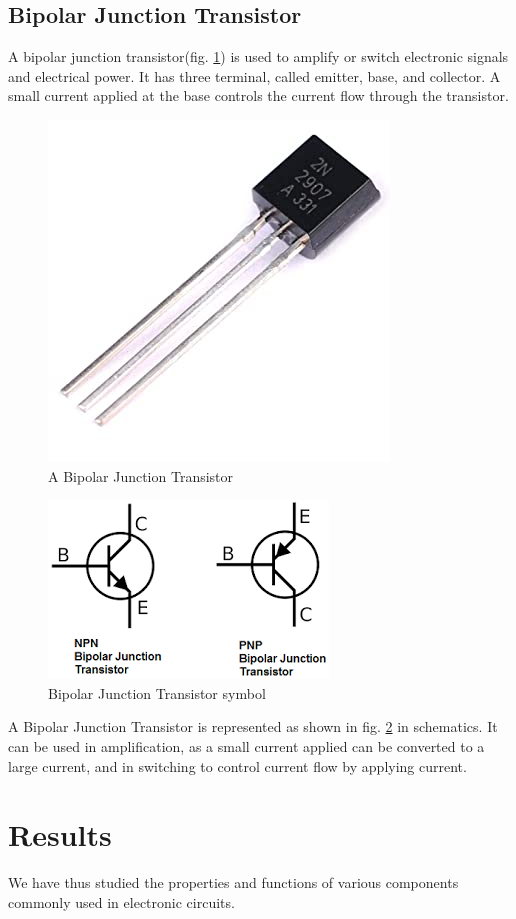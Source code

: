 \documentclass{article}
\begin{document}
\subsection{Bipolar Junction Transistor}
A bipolar junction transistor(fig. \ref{fig:bjt}) is used to amplify or switch electronic signals and electrical power. It has three terminal, called emitter, base, and collector. A small current applied at the base controls the current flow through the transistor. \\
\begin{figure}[h]
	\centering
	\includegraphics[width=0.5\linewidth]{bjt}
	\caption[A Bipolar Junction Transistor]{A Bipolar Junction Transistor}
	\label{fig:bjt}
\end{figure}
\begin{figure}[h]
	\centering
	\includegraphics[width=0.2\linewidth]{bjt_symbol}
	\caption{Bipolar Junction Transistor symbol}
	\label{fig:bjtsymbol}
\end{figure}
A Bipolar Junction Transistor is represented as shown in fig. \ref{fig:bjtsymbol} in schematics. It can be used in amplification, as a small current applied can be converted to a large current, and in switching to control current flow by applying current.


\section{Results}
We have thus studied the properties and functions of various components commonly used in electronic circuits.
\end{document}
